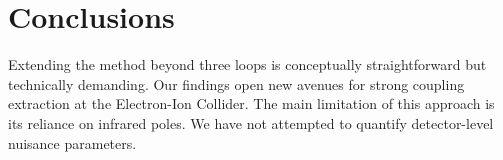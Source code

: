 \section{Conclusions}\label{sec:conclusions}

Extending the method beyond three loops is conceptually straightforward
but technically demanding. Our findings open new avenues for strong
coupling extraction at the Electron-Ion Collider. The main limitation of
this approach is its reliance on infrared poles. We have not attempted
to quantify detector-level nuisance parameters.


